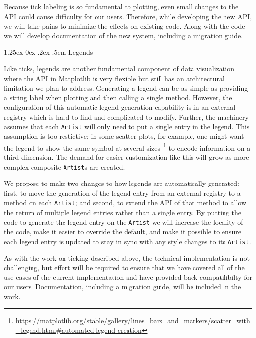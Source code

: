 \documentclass[12pt]{article}
\makeatletter
\numberwithin{page}{section}
\renewcommand{\paragraph}{%
  \@startsection{paragraph}{4}%
  {\z@}{1.25ex \@plus 0ex \@minus .2ex}{-.5em}%
  {\normalfont\normalsize\itshape\bfseries}%
}
\makeatother
\begin{document}
Because tick labeling is so fundamental to plotting, even small changes to the
API could cause difficulty for our users. Therefore, while developing the
new API, we will take pains to minimize the effects on existing code. Along with the code we will
develop documentation of the new system, including a migration guide.

\paragraph{Legends}

Like ticks, legends are another fundamental component of data
visualization where the API in Matplotlib is very flexible but still has
an architectural limitation we plan to address.
Generating a legend can be as simple as providing a string label when plotting and
then calling a single method.  However, the configuration of this automatic
legend generation capability is in an external registry which is hard to find
and complicated to modify.  Further, the machinery assumes that
each \texttt{Artist} will only need to put a single entry in the legend.  This
assumption is too restictive; in
some scatter plots, for example, one might want the legend to show the same
symbol at several
sizes\
\footnote{\url{https://matplotlib.org/stable/gallery/lines_bars_and_markers/scatter_with_legend.html\#automated-legend-creation}}
to encode information on a third dimension.
The demand for easier customization like this will grow as more complex
composite \texttt{Artist}s are created.


We propose to make two changes to how legends are automatically generated: first,
to move the generation of the legend entry from an external registry to a
method on each \texttt{Artist}; and second, to extend the API of that method to
allow the return of multiple legend entries rather than a single entry.  By
putting the code to generate the legend entry on the \texttt{Artist} we will
increase the locality of the code, make it easier to override the default, and
make it possible to ensure each legend entry is updated to stay in sync with any
style changes to its \texttt{Artist}.

As with the work on ticking described above, the technical implementation is not
challenging, but effort will be required to ensure that we have covered all of the use cases of the current
implementation and have provided back-compatilibilty for our users.
Documentation,
including a migration guide, will be included in the work.
\end{document}

